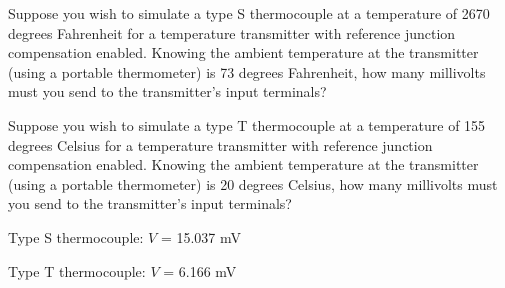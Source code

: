 

Suppose you wish to simulate a type S thermocouple at a temperature of 2670 degrees Fahrenheit for a temperature transmitter with reference junction compensation enabled.  Knowing the ambient temperature at the transmitter (using a portable thermometer) is 73 degrees Fahrenheit, how many millivolts must you send to the transmitter's input terminals?

\vskip 10pt

Suppose you wish to simulate a type T thermocouple at a temperature of 155 degrees Celsius for a temperature transmitter with reference junction compensation enabled.  Knowing the ambient temperature at the transmitter (using a portable thermometer) is 20 degrees Celsius, how many millivolts must you send to the transmitter's input terminals?







Type S thermocouple: $V$ = 15.037 mV

\vskip 10pt

Type T thermocouple: $V$ = 6.166 mV










